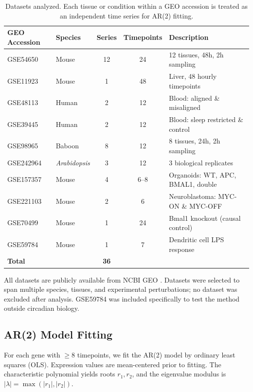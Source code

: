 \documentclass[11pt,letterpaper]{article}
\begin{document}
\begin{table}[H]
\centering
\caption{Datasets analyzed. Each tissue or condition within a GEO accession is treated as an independent time series for AR(2) fitting.}
\label{tab:datasets}
\begin{tabular}{llccl}
\toprule
\textbf{GEO Accession} & \textbf{Species} & \textbf{Series} & \textbf{Timepoints} & \textbf{Description} \\
\midrule
GSE54650 & Mouse & 12 & 24 & 12 tissues, 48h, 2h sampling \\
GSE11923 & Mouse & 1 & 48 & Liver, 48 hourly timepoints \\
GSE48113 & Human & 2 & 12 & Blood: aligned \& misaligned \\
GSE39445 & Human & 2 & 12 & Blood: sleep restricted \& control \\
GSE98965 & Baboon & 8 & 12 & 8 tissues, 24h, 2h sampling \\
GSE242964 & \textit{Arabidopsis} & 3 & 12 & 3 biological replicates \\
GSE157357 & Mouse & 4 & 6--8 & Organoids: WT, APC, BMAL1, double \\
GSE221103 & Mouse & 2 & 6 & Neuroblastoma: MYC-ON \& MYC-OFF \\
GSE70499 & Mouse & 1 & 24 & Bmal1 knockout (causal control) \\
GSE59784 & Mouse & 1 & 7 & Dendritic cell LPS response \\
\midrule
\multicolumn{2}{l}{\textbf{Total}} & \textbf{36} & & \\
\bottomrule
\end{tabular}
\end{table}

All datasets are publicly available from NCBI GEO \citep{barrett2013ncbi}. Datasets were selected to span multiple species, tissues, and experimental perturbations; no dataset was excluded after analysis. GSE59784 \citep{rabani2011metabolic} was included specifically to test the method outside circadian biology.

\subsection{AR(2) Model Fitting}

For each gene with $\geq 8$ timepoints, we fit the AR(2) model by ordinary least squares (OLS). Expression values are mean-centered prior to fitting. The characteristic polynomial yields roots $r_1, r_2$, and the eigenvalue modulus is $|\lambda| = \max(|r_1|, |r_2|)$.
\end{document}
